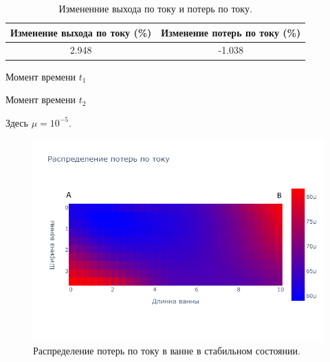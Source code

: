 \documentclass{article}
\begin{document}
\begin{table}[ht]
\centering
\begin{tabular}{|c|c|}
\hline
Изменение выхода по току (\%)	& Изменение потерь по току (\%) \\
\hline
2.948 & -1.038\\ 
\hline
\end{tabular}
\caption{Измененние выхода по току и потерь по току.}
\end{table}

Момент времени $t_1$

Момент времени $t_2$

Здесь $\mu = 10^{-5}$.

\begin{figure}[H]
\hspace*{-5cm}\includegraphics[width=200mm]{hloss.png}
\caption{Распределение потерь по току в ванне в стабильном состоянии.\label{fig:raspStab}}
\end{figure}
\end{document}
